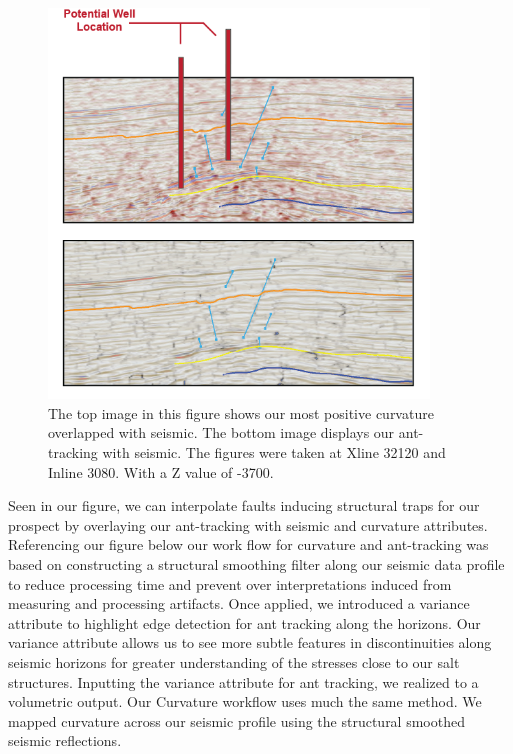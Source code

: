 \documentclass[fleqn]{article}
\begin{document}
\begin{figure}[H]
    \centering
    \includegraphics[width=0.9\textwidth]{Images/Curvature-Well Location.png}
    \caption{The top image in this figure shows our most positive curvature overlapped with seismic. The bottom image displays our ant-tracking with seismic. The figures were taken at Xline 32120 and Inline 3080. With a Z value of -3700.}
\label{fig:CurvatureOverlapping}
\end{figure}

Seen in our figure, we can interpolate faults inducing structural traps for our prospect by overlaying our ant-tracking with seismic and curvature attributes. Referencing our figure below our work flow for curvature and ant-tracking was based on constructing a structural smoothing filter along our seismic data profile to reduce processing time and prevent over interpretations induced from measuring and processing artifacts. Once applied, we introduced a variance attribute to highlight edge detection for ant tracking along the horizons. Our variance attribute allows us to see more subtle features in discontinuities along seismic horizons for greater understanding of the stresses close to our salt structures. Inputting the variance attribute for ant tracking, we realized to a volumetric output. Our Curvature workflow uses much the same method. We mapped curvature across our seismic profile using the structural smoothed seismic reflections. 
\end{document}
